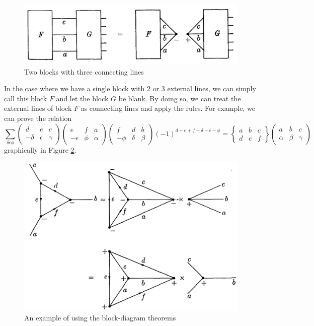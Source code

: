 \documentclass[11pt]{article}
\newcommand{\al}{\alpha}
\newcommand{\be}{\beta}
\newcommand{\tj}[6]{ \begin{pmatrix}
		#1 & #2 & #3 \\
		#4 & #5 & #6 
\end{pmatrix}}
\newcommand{\Gj}[6]{ \begin{Bmatrix}
		#1 & #2 & #3 \\
		#4 & #5 & #6 
\end{Bmatrix}}
\begin{document}
\begin{appendices}
	\begin{figure}[!htb]
		\centering
		\includegraphics[scale=0.7]{blocks_three_lines}
		\caption{Two blocks with three connecting lines \cite{angular_momentum}}
		\label{fig:three}
	\end{figure}

In the case where we have a single block with 2 or 3 external lines, we can simply call this block $F$ and let the block $G$ be blank. By doing so, we can treat the external lines of block $F$ as connecting lines and apply the rules. For example, we can prove the relation
\begin{equation*}
\sum_{\delta\epsilon\phi}\tj{d}{e}{c}{-\delta}{\epsilon}{\gamma}\tj{e}{f}{a}{-\epsilon}{\phi}{\al}\tj{f}{d}{b}{-\phi}{\delta}{\beta}(-1)^{d+e+f-\delta-\epsilon-\phi} = \Gj{a}{b}{c}{d}{e}{f}\tj{a}{b}{c}{\al}{\be}{\gamma}
\end{equation*}
graphically in Figure \ref{fig:graph}.
\begin{figure}[!htb]
	\centering
	\includegraphics[scale=0.7]{blocks_ex}
	\caption{An example of using the block-diagram theorems \cite{angular_momentum}}
	\label{fig:graph}
\end{figure}


\end{appendices}
\end{document}
